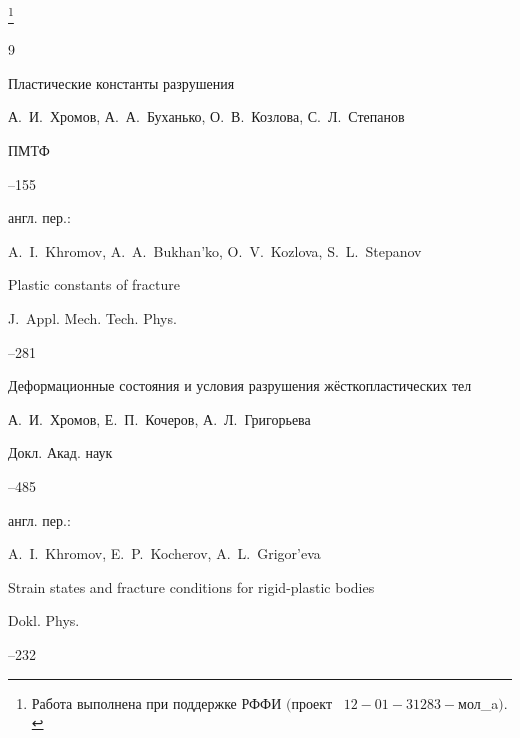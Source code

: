 {\thanks{Работа выполнена при поддержке РФФИ $($проект \rm \No~$12{-}01{-}31283{-}$мол\_a$).$}}






\begin{thebibliography}{9}




\paper Пластические константы разрушения

\by А.~И.~Хромов, А.~А.~Буханько, О.~В.~Козлова, С.~Л.~Степанов

\jour ПМТФ




--155

\transl англ. пер.:~

\by A.~I.~Khromov, A.~A.~Bukhan'ko, O.~V.~Kozlova, S.~L.~Stepanov

\paper Plastic constants of fracture

\jour J.~Appl. Mech. Tech. Phys. 



--281 





\paper Деформационные состояния и условия разрушения жёсткопластических тел

\by А.~И.~Хромов, Е.~П.~Кочеров, А.~Л.~Григорьева

\jour Докл. Акад. наук




--485

\transl англ. пер.:~

\by A.~I.~Khromov, E.~P.~Kocherov,  A.~L.~Grigor'eva

\paper Strain states and fracture conditions for rigid-plastic bodies

\jour Dokl. Phys. 



--232 







\end{thebibliography}
